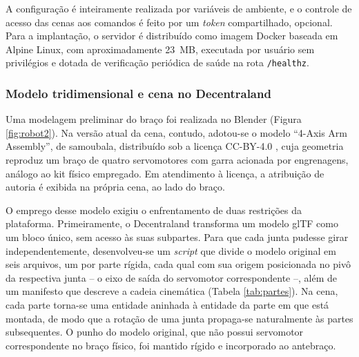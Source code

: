 \documentclass[12pt]{article}
\begin{document}
A configuração é inteiramente realizada por variáveis de ambiente, e o controle de acesso das cenas aos comandos é feito por um \textit{token} compartilhado, opcional. Para a implantação, o servidor é distribuído como imagem Docker baseada em Alpine Linux, com aproximadamente 23~MB, executada por usuário sem privilégios e dotada de verificação periódica de saúde na rota \texttt{/healthz}.

\subsubsection{Modelo tridimensional e cena no Decentraland}
\label{subsec:cena}

Uma modelagem preliminar do braço foi realizada no Blender (Figura \ref{fig:robot2}). Na versão atual da cena, contudo, adotou-se o modelo ``4-Axis Arm Assembly'', de samoubala, distribuído sob a licença CC-BY-4.0 \cite{samoubala_arm}, cuja geometria reproduz um braço de quatro servomotores com garra acionada por engrenagens, análogo ao kit físico empregado. Em atendimento à licença, a atribuição de autoria é exibida na própria cena, ao lado do braço.

O emprego desse modelo exigiu o enfrentamento de duas restrições da plataforma. Primeiramente, o Decentraland transforma um modelo glTF \cite{gltf_spec} como um bloco único, sem acesso às suas subpartes. Para que cada junta pudesse girar independentemente, desenvolveu-se um \textit{script} que divide o modelo original em seis arquivos, um por parte rígida, cada qual com sua origem posicionada no pivô da respectiva junta -- o eixo de saída do servomotor correspondente --, além de um manifesto que descreve a cadeia cinemática (Tabela \ref{tab:partes}). Na cena, cada parte torna-se uma entidade aninhada à entidade da parte em que está montada, de modo que a rotação de uma junta propaga-se naturalmente às partes subsequentes. O punho do modelo original, que não possui servomotor correspondente no braço físico, foi mantido rígido e incorporado ao antebraço.
\end{document}
